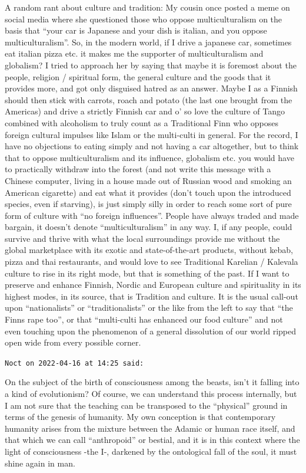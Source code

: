 \begin{footnotesize}
\begin{sffamily}
A random rant about culture and tradition: My cousin once posted a meme on social media where she questioned those who oppose multiculturalism on the basis that ``your car is Japanese and your dish is italian, and you oppose multiculturalism''. So, in the modern world, if I drive a japanese car, sometimes eat italian pizza etc. it makes me the supporter of multiculturalism and globalism? I tried to approach her by saying that maybe it is foremost about the people, religion / spiritual form, the general culture and the goods that it provides more, and got only disguised hatred as an answer. Maybe I as a Finnish should then stick with carrots, roach and potato (the last one brought from the Americas) and drive a strictly Finnish car and o' so love the culture of Tango combined with alcoholism to truly count as a Traditional Finn who opposes foreign cultural impulses like Islam or the multi-culti in general. For the record, I have no objections to eating simply and not having a car altogether, but to think that to oppose multiculturalism and its influence, globalism etc. you would have to practically withdraw into the forest (and not write this message with a Chinese computer, living in a house made out of Russian wood and smoking an American cigarette) and eat what it provides (don't touch upon the introduced species, even if starving), is just simply silly in order to reach some sort of pure form of culture with ``no foreign influences''. People have always traded and made bargain, it doesn't denote ``multiculturalism'' in any way. I, if any people, could survive and thrive with what the local surroundings provide me without the global marketplace with its exotic and state-of-the-art products, without kebab, pizza and thai restaurants, and would love to see Traditional Karelian / Kalevala culture to rise in its right mode, but that is something of the past. If I want to preserve and enhance Finnish, Nordic and European culture and spirituality in its highest modes, in its source, that is Tradition and culture. It is the usual call-out upon ``nationalists'' or ``traditionalists'' or the like from the left to say that ``the Finns rape too'', or that ``multi-culti has enhanced our food culture'' and not even touching upon the phenomenon of a general dissolution of our world ripped open wide from every possible corner.

\hfill

\texttt{Noct on 2022-04-16 at 14:25 said:}

On the subject of the birth of consciousness among the beasts, isn't it falling into a kind of evolutionism? Of course, we can understand this process internally, but I am not sure that the teaching can be transposed to the ``physical'' ground in terms of the genesis of humanity. My own conception is that contemporary humanity arises from the mixture between the Adamic or human race itself, and that which we can call ``anthropoid'' or bestial, and it is in this context where the light of consciousness -the I-, darkened by the ontological fall of the soul, it must shine again in man.


\end{sffamily}
\end{footnotesize}
